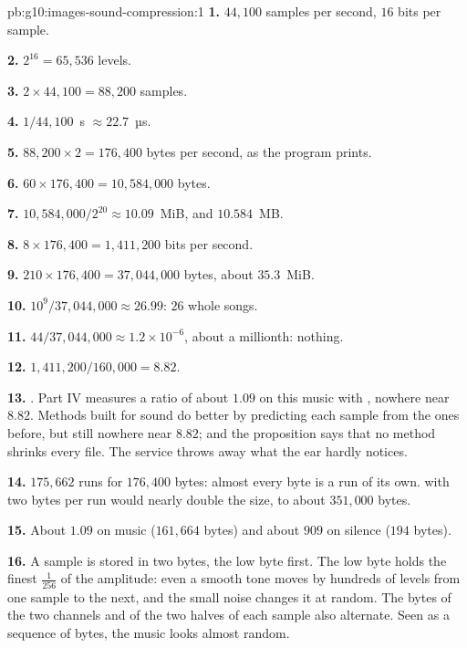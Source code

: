 \begin{solution}{pb:g10:images-sound-compression:1}
\textbf{1.} $44{,}100$ samples per second, $16$ bits per sample.

\textbf{2.} $2^{16} = 65{,}536$ levels.

\textbf{3.} $2 \times 44{,}100 = 88{,}200$ samples.

\textbf{4.} $1/44{,}100$~s $\approx 22.7$~µs.

\textbf{5.} $88{,}200 \times 2 = 176{,}400$ bytes per second, as the program prints.

\textbf{6.} $60 \times 176{,}400 = 10{,}584{,}000$ bytes.

\textbf{7.} $10{,}584{,}000 / 2^{20} \approx 10.09$~MiB, and $10.584$~MB.

\textbf{8.} $8 \times 176{,}400 = 1{,}411{,}200$ bits per second.

\textbf{9.} $210 \times 176{,}400 = 37{,}044{,}000$ bytes, about $35.3$~MiB.

\textbf{10.} $10^9 / 37{,}044{,}000 \approx 26.99$: $26$ whole songs.

\textbf{11.} $44 / 37{,}044{,}000 \approx 1.2 \times 10^{-6}$, about a millionth: nothing.

\textbf{12.} $1{,}411{,}200 / 160{,}000 = 8.82$.

\textbf{13.} . Part IV measures a  ratio of about $1.09$ on this music with , nowhere near $8.82$. Methods built
for sound do better by predicting each sample from the ones before, but still nowhere near $8.82$; and the
proposition says that no  method shrinks every file. The service throws away what the ear hardly notices.

\textbf{14.} $175{,}662$ runs for $176{,}400$ bytes: almost every byte is a run of its own.  with
two bytes per run would nearly double the size, to about $351{,}000$ bytes.

\textbf{15.} About $1.09$ on music ($161{,}664$ bytes) and about $909$ on silence ($194$ bytes).

\textbf{16.} A sample is stored in two bytes, the low byte first. The low byte holds the finest $\tfrac{1}{256}$ of
the amplitude: even a smooth tone moves by hundreds of levels from one sample to the next, and the small noise
changes it at random. The bytes of the two channels and of the two halves of each sample also alternate. Seen as a
sequence of bytes, the music looks almost random.


\end{solution}
